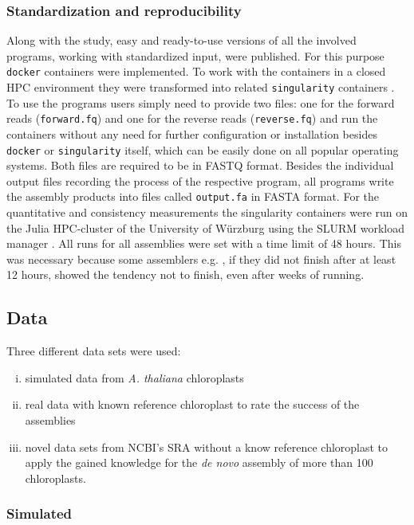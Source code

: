 \subsubsection{Standardization and reproducibility}

Along with the study, easy and ready-to-use versions of all the involved programs, working
with standardized input, were published. For this purpose \texttt{docker} containers
\cite{merkel2014docker} were implemented. To work with the containers in a closed HPC
environment they were transformed into related \texttt{singularity} containers
\cite{kurtzer2017singularity}. To use the programs users simply need to provide two files:
one for the forward reads (\texttt{forward.fq}) and one for the reverse reads
(\texttt{reverse.fq}) and run the containers without any need for further configuration or
installation besides \texttt{docker} or \texttt{singularity} itself, which can be easily
done on all popular operating systems. Both files are required to be in FASTQ
format. Besides the individual output files recording the process of the respective
program, all programs write the assembly products into files called \texttt{output.fa} in
FASTA format. For the quantitative and consistency measurements the singularity containers
were run on the Julia HPC-cluster of the University of W\"{u}rzburg using the SLURM
workload manager \cite{Jette02slurm}. All runs for all assemblies were set with a time
limit of 48 hours. This was necessary because some assemblers e.g. \ioga, if they did not finish
after at least 12 hours, showed the tendency not to finish, even after weeks of running.

\subsection{Data}
Three different data sets were used:
\begin{enumerate}[(i)]
\item simulated data from \textit{A. thaliana} chloroplasts 
\item real data with known reference chloroplast to rate the success of the assemblies 
\item novel data sets from NCBI's SRA without a know reference chloroplast to apply the gained knowledge for the
\textit{de novo} assembly of more than 100 chloroplasts.
\end{enumerate}
\subsubsection{Simulated}

